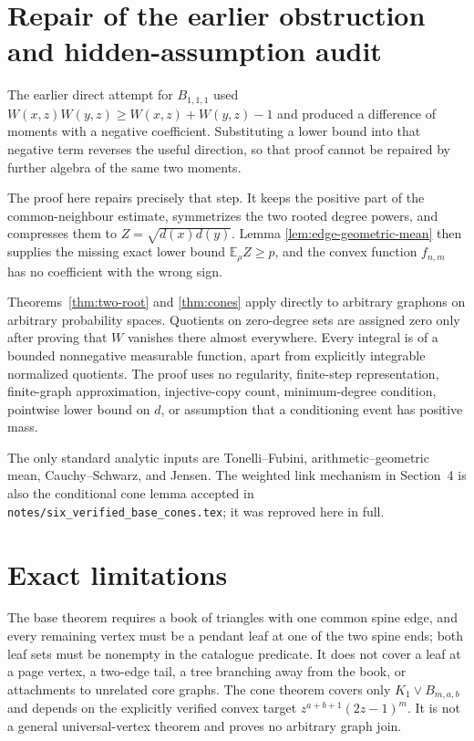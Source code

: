 \documentclass[11pt]{article}
\newcommand{\join}{\mathbin{\vee}}
\begin{document}
\section{Repair of the earlier obstruction and hidden-assumption audit}

The earlier direct attempt for $B_{1,1,1}$ used
$W(x,z)W(y,z)\geq W(x,z)+W(y,z)-1$ and produced a difference of moments
with a negative coefficient.  Substituting a lower bound into that negative
term reverses the useful direction, so that proof cannot be repaired by
further algebra of the same two moments.

The proof here repairs precisely that step.  It keeps the positive part of
the common-neighbour estimate, symmetrizes the two rooted degree powers, and
compresses them to $Z=\sqrt{d(x)d(y)}$.  Lemma
\ref{lem:edge-geometric-mean} then supplies the missing exact lower bound
$\mathbb E_\rho Z\geq p$, and the convex function $f_{n,m}$ has no coefficient
with the wrong sign.

Theorems~\ref{thm:two-root} and \ref{thm:cones} apply directly to arbitrary
graphons on arbitrary probability spaces.  Quotients on zero-degree sets
are assigned zero only after proving that $W$ vanishes there almost
everywhere.  Every integral is of a bounded nonnegative measurable function,
apart from explicitly integrable normalized quotients.  The proof uses no
regularity, finite-step representation, finite-graph approximation,
injective-copy count, minimum-degree condition, pointwise lower bound on
$d$, or assumption that a conditioning event has positive mass.

The only standard analytic inputs are Tonelli--Fubini, arithmetic--geometric
mean, Cauchy--Schwarz, and Jensen.  The weighted link mechanism in
Section~4 is also the conditional cone lemma accepted in
\texttt{notes/six\_verified\_base\_cones.tex}; it was reproved here in full.


\section{Exact limitations}

The base theorem requires a book of triangles with one common spine edge,
and every remaining vertex must be a pendant leaf at one of the two spine
ends; both leaf sets must be nonempty in the catalogue predicate.  It does
not cover a leaf at a page vertex, a two-edge tail, a tree branching away
from the book, or attachments to unrelated core graphs.  The cone theorem
covers only $K_1\join B_{m,a,b}$ and depends on the explicitly verified
convex target $z^{a+b+1}(2z-1)^m$.  It is not a
general universal-vertex theorem and proves no arbitrary graph join.
\end{document}
